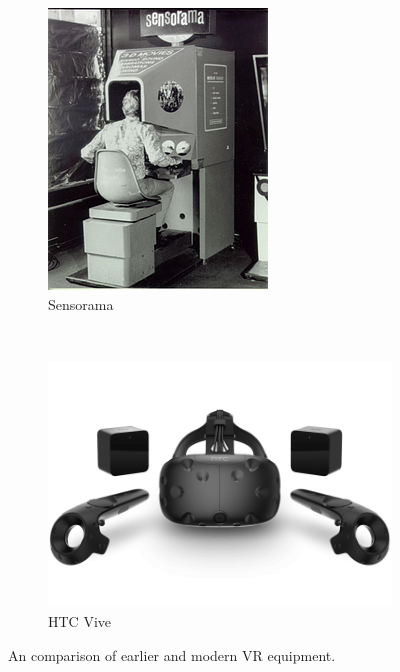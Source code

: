 \documentclass{scrartcl}
\begin{document}
\begin{figure}[h!]

\centering

\begin{subfigure}[b]{0.3\linewidth}
	\centering
	\includegraphics[width=\linewidth]{Sensorama.jpg}
	\caption{Sensorama}
\end{subfigure}%
~
\begin{subfigure}[b]{0.3\linewidth}
	\centering
	\includegraphics[width=\linewidth]{vive.png}
	\caption{HTC Vive}
\end{subfigure}
\caption{An comparison of earlier and modern VR equipment.}
\label{fig:VR}

\end{figure}



\end{document}
